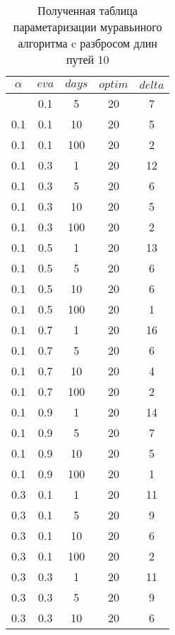 \begin{appendices}
	\begin{longtable}{|c|c|c|c|c|}
	\caption{Полученная таблица параметаризации муравьиного алгоритма c разбросом длин путей 10}\label{t:params_3}\\
	\hline
	$\alpha$ & $eva$ & $days$ & $optim$ & $delta$ \\ \hline
	\endhead
	\endfoot
 0.1   & 0.1    & 5    & 20    & 7     \\ \hline
 0.1   & 0.1    & 10   & 20    & 5     \\ \hline
 0.1   & 0.1    & 100  & 20    & 2     \\ \hline
 0.1   & 0.3    & 1    & 20    & 12    \\ \hline
 0.1   & 0.3    & 5    & 20    & 6     \\ \hline
 0.1   & 0.3    & 10   & 20    & 5     \\ \hline
 0.1   & 0.3    & 100  & 20    & 2     \\ \hline
 0.1   & 0.5    & 1    & 20    & 13    \\ \hline
 0.1   & 0.5    & 5    & 20    & 6     \\ \hline
 0.1   & 0.5    & 10   & 20    & 6     \\ \hline
 0.1   & 0.5    & 100  & 20    & 1     \\ \hline
 0.1   & 0.7    & 1    & 20    & 16    \\ \hline
 0.1   & 0.7    & 5    & 20    & 6     \\ \hline
 0.1   & 0.7    & 10   & 20    & 4     \\ \hline
 0.1   & 0.7    & 100  & 20    & 2     \\ \hline
 0.1   & 0.9    & 1    & 20    & 14    \\ \hline
 0.1   & 0.9    & 5    & 20    & 7     \\ \hline
 0.1   & 0.9    & 10   & 20    & 5     \\ \hline
 0.1   & 0.9    & 100  & 20    & 1     \\ \hline
 0.3   & 0.1    & 1    & 20    & 11    \\ \hline
 0.3   & 0.1    & 5    & 20    & 9     \\ \hline
 0.3   & 0.1    & 10   & 20    & 6     \\ \hline
 0.3   & 0.1    & 100  & 20    & 2     \\ \hline
 0.3   & 0.3    & 1    & 20    & 11    \\ \hline
 0.3   & 0.3    & 5    & 20    & 9     \\ \hline
 0.3   & 0.3    & 10   & 20    & 6     \\ \hline

\end{longtable}
\end{appendices}
